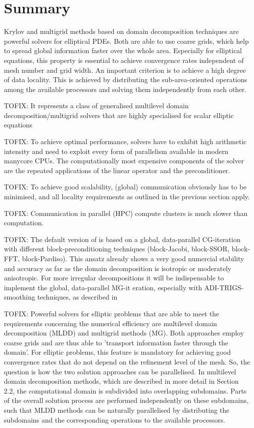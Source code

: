 \section{Summary}

Krylov and multigrid methods based on domain decomposition techniques are powerful solvers for elliptical PDEs. Both are able to use coarse grids, which help to spread global information faster over the whole area. Especially for elliptical equations, this property is essential to achieve convergence rates independent of mesh number and grid width. An important criterion is to achieve a high degree of data locality. This is achieved by distributing the sub-area-oriented operations among the available processors and solving them independently from each other.

TOFIX: It represents a class of generalised multilevel domain decomposition/multigrid solvers that are highly specialised for scalar elliptic equations

TOFIX: To achieve optimal performance, solvers have to exhibit high arithmetic intensity and need to exploit every form of parallelism available in modern manycore CPUs. The computationally most expensive components of the solver are the repeated applications of the linear operator and the preconditioner.

TOFIX: To achieve good scalability, (global) communication obviously has to be minimised, and all locality requirements as outlined in the previous section apply.

TOFIX: Communication in parallel (HPC) compute clusters is much slower than computation.

 
TOFIX:
The default version of \scarc{} is based on a global, data-parallel CG-iteration with different block-preconditioning techniques (block-Jacobi, block-SSOR, block-FFT, block-Pardiso). This ansatz already shows a very     good numercial stability and accuracy as far as the domain decomposition is isotropic or moderately anisotropic. For more irregular decompositions it will be indispensable to implement the global, data-parallel MG-it    eration, especially with ADI-TRIGS-smoothing techniques, as described in %


TOFIX: Powerful solvers for elliptic problems that are able to meet the requirements concerning the numerical efficiency are multilevel domain decomposition (MLDD) and multigrid methods (MG). Both approaches employ coarse grids and are thus able to 'transport information faster through the domain'. For elliptic problems, this feature is mandatory for achieving good convergence rates that do not depend on the refinement level of the mesh. So, the question is how the two solution approaches can be parallelised. In multilevel domain decomposition methods, which are described in more detail in Section 2.2, the computational domain is subdivided into overlapping subdomains. Parts of the overall solution process are performed independently on these subdomains, such that MLDD methods can be naturally parallelised by distributing the subdomains and the corresponding operations to the available processors.


